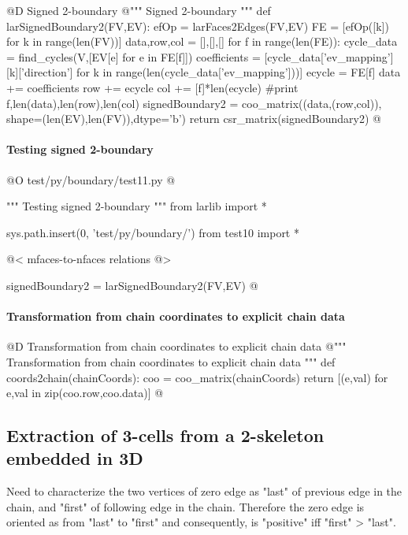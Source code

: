 \documentclass[11pt,oneside]{article}    %
\begin{document}
@D Signed 2-boundary
@{""" Signed 2-boundary """
def larSignedBoundary2(FV,EV):
    efOp = larFaces2Edges(FV,EV)
    FE = [efOp([k]) for k in range(len(FV))]
    data,row,col = [],[],[]
    for f in range(len(FE)):
        cycle_data = find_cycles(V,[EV[e] for e in FE[f]])
        coefficients = [cycle_data['ev_mapping'][k]['direction'] 
              for k in range(len(cycle_data['ev_mapping']))]
        ecycle = FE[f]
        data += coefficients
        row += ecycle
        col += [f]*len(ecycle)
        #print f,len(data),len(row),len(col)
    signedBoundary2 = coo_matrix((data,(row,col)), shape=(len(EV),len(FV)),dtype='b')
    return csr_matrix(signedBoundary2)
@}


\paragraph{Testing signed 2-boundary}
@O test/py/boundary/test11.py
@{""" Testing signed 2-boundary """
from larlib import *

sys.path.insert(0, 'test/py/boundary/')
from test10 import *

@< mfaces-to-nfaces relations @>

signedBoundary2 = larSignedBoundary2(FV,EV)
@}



\paragraph{Transformation from chain coordinates to explicit chain data}
@D Transformation from chain coordinates to explicit chain data
@{""" Transformation from chain coordinates to explicit chain data """
def coords2chain(chainCoords):
    coo = coo_matrix(chainCoords)
    return [(e,val) for e,val in zip(coo.row,coo.data)]
@}


\subsection{Extraction of 3-cells from a 2-skeleton embedded in 3D}
Need to characterize the two vertices of zero edge as "last" of previous edge in the chain,
and "first" of following edge in the chain. Therefore the zero edge is oriented as from "last" to "first" and consequently, is "positive" iff  "first" > "last".
\end{document}
